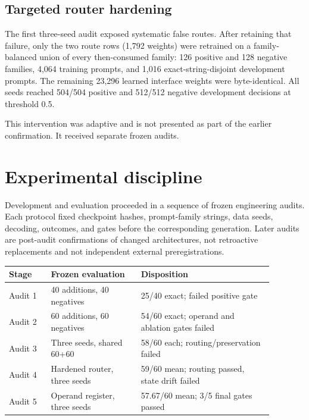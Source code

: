 \documentclass[11pt]{article}
\begin{document}
\subsection{Targeted router hardening}

The first three-seed audit exposed systematic false routes. After retaining
that failure, only the two route rows (1,792 weights) were retrained on a
family-balanced union of every then-consumed family: 126 positive and 128
negative families, 4,064 training prompts, and 1,016 exact-string-disjoint
development prompts. The remaining 23,296 learned interface weights were
byte-identical. All seeds reached 504/504 positive and 512/512 negative
development decisions at threshold 0.5.

This intervention was adaptive and is not presented as part of the earlier
confirmation. It received separate frozen audits.

\section{Experimental discipline}

Development and evaluation proceeded in a sequence of frozen engineering
audits. Each protocol fixed checkpoint hashes, prompt-family strings, data
seeds, decoding, outcomes, and gates before the corresponding generation.
Later audits are post-audit confirmations of changed architectures, not
retroactive replacements and not independent external preregistrations.

\begin{center}
\small
\begin{tabular}{p{0.14\linewidth}p{0.30\linewidth}p{0.44\linewidth}}
\toprule
Stage & Frozen evaluation & Disposition\\
\midrule
Audit 1 & 40 additions, 40 negatives & 25/40 exact; failed positive gate\\
Audit 2 & 60 additions, 60 negatives & 54/60 exact; operand and ablation gates failed\\
Audit 3 & Three seeds, shared 60+60 & 58/60 each; routing/preservation failed\\
Audit 4 & Hardened router, three seeds & 59/60 mean; routing passed, state drift failed\\
Audit 5 & Operand register, three seeds & 57.67/60 mean; 3/5 final gates passed\\
\bottomrule
\end{tabular}
\end{center}
\end{document}
